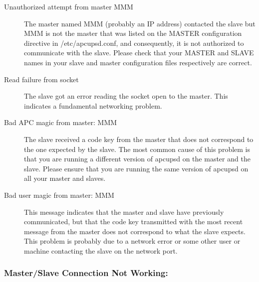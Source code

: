 {{{{{{\begin{description}
\item[Unauthorized attempt from master MMM]
   \label{Unauthorized-attempt-from-master-MMM}
The master named MMM (probably an IP address) contacted the slave but MMM is
not the master that was listed on the MASTER configuration directive in
/etc/apcupsd.conf, and consequently, it is not authorized to communicate with
the slave. Please check that your MASTER and SLAVE names in your slave and
master configuration files respectively are correct. 

\item[Read failure from socket]
   \label{Read-failure-from-socket}
The slave got an error reading the socket open to the master. This indicates a
fundamental networking problem. 

\item[Bad APC magic from master: MMM]
   \label{Bad-APC-magic-from-master_003b-MMM}
The slave received a code key from the master that does not correspond to the
one expected by the slave. The most common cause of this problem is that you
are running a different version of apcupsd on the master and the slave. Please
ensure that you are running the same version of apcupsd on all your master and
slaves. 

\item[Bad user magic from master: MMM]
   \label{Bad-user-magic-from-master_003b-MMM}
This message indicates that the master and slave have previously communicated,
but that the code key transmitted with the most recent message from the master
does not correspond to what the slave expects. This problem is probably due to
a network error or some other user or machine contacting the slave on the
network port. 
\end{description}

\label{Master_002fSlave-Connection-Not-Working}

\subsubsection*{Master/Slave Connection Not Working:}

}}}}}}
